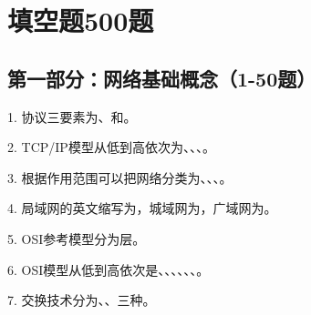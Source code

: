 \chapter{填空题500题}

\section{第一部分：网络基础概念（1-50题）}

1. 协议三要素为\underline{\hspace{2cm}}、\underline{\hspace{2cm}}和\underline{\hspace{2cm}}。

2. TCP/IP模型从低到高依次为\underline{\hspace{2cm}}、\underline{\hspace{2cm}}、\underline{\hspace{2cm}}、\underline{\hspace{2cm}}。

3. 根据作用范围可以把网络分类为\underline{\hspace{1.5cm}}、\underline{\hspace{1.5cm}}、\underline{\hspace{1.5cm}}、\underline{\hspace{1.5cm}}。

4. 局域网的英文缩写为\underline{\hspace{2cm}}，城域网为\underline{\hspace{2cm}}，广域网为\underline{\hspace{2cm}}。

5. OSI参考模型分为\underline{\hspace{1cm}}层。

6. OSI模型从低到高依次是\underline{\hspace{1.2cm}}、\underline{\hspace{1.2cm}}、\underline{\hspace{1.2cm}}、\underline{\hspace{1.2cm}}、\underline{\hspace{1.2cm}}、\underline{\hspace{1.2cm}}、\underline{\hspace{1.2cm}}。

7. 交换技术分为\underline{\hspace{2cm}}、\underline{\hspace{2cm}}、\underline{\hspace{2cm}}三种。

